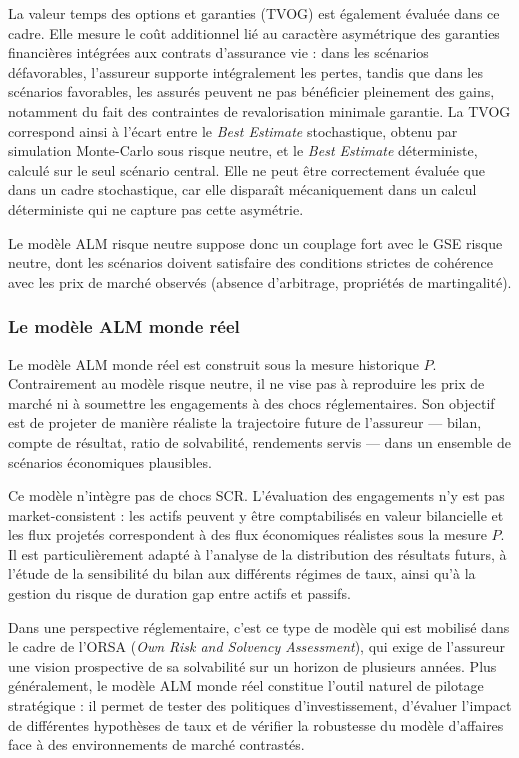La valeur temps des options et garanties (TVOG) est également évaluée dans ce cadre. Elle mesure le coût additionnel lié au caractère asymétrique des garanties financières intégrées aux contrats d'assurance vie : dans les scénarios défavorables, l'assureur supporte intégralement les pertes, tandis que dans les scénarios favorables, les assurés peuvent ne pas bénéficier pleinement des gains, notamment du fait des contraintes de revalorisation minimale garantie. La TVOG correspond ainsi à l'écart entre le \textit{Best Estimate} stochastique, obtenu par simulation Monte-Carlo sous risque neutre, et le \textit{Best Estimate} déterministe, calculé sur le seul scénario central. Elle ne peut être correctement évaluée que dans un cadre stochastique, car elle disparaît mécaniquement dans un calcul déterministe qui ne capture pas cette asymétrie.

Le modèle ALM risque neutre suppose donc un couplage fort avec le GSE risque neutre, dont les scénarios doivent satisfaire des conditions strictes de cohérence avec les prix de marché observés (absence d'arbitrage, propriétés de martingalité).

\subsubsection{Le modèle ALM monde réel}

Le modèle ALM monde réel est construit sous la mesure historique $P$. Contrairement au modèle risque neutre, il ne vise pas à reproduire les prix de marché ni à soumettre les engagements à des chocs réglementaires. Son objectif est de projeter de manière réaliste la trajectoire future de l'assureur — bilan, compte de résultat, ratio de solvabilité, rendements servis — dans un ensemble de scénarios économiques plausibles.

Ce modèle n'intègre pas de chocs SCR. L'évaluation des engagements n'y est pas market-consistent : les actifs peuvent y être comptabilisés en valeur bilancielle et les flux projetés correspondent à des flux économiques réalistes sous la mesure $P$. Il est particulièrement adapté à l'analyse de la distribution des résultats futurs, à l'étude de la sensibilité du bilan aux différents régimes de taux, ainsi qu'à la gestion du risque de duration gap entre actifs et passifs.

Dans une perspective réglementaire, c'est ce type de modèle qui est mobilisé dans le cadre de l'ORSA (\textit{Own Risk and Solvency Assessment}), qui exige de l'assureur une vision prospective de sa solvabilité sur un horizon de plusieurs années. Plus généralement, le modèle ALM monde réel constitue l'outil naturel de pilotage stratégique : il permet de tester des politiques d'investissement, d'évaluer l'impact de différentes hypothèses de taux et de vérifier la robustesse du modèle d'affaires face à des environnements de marché contrastés.

